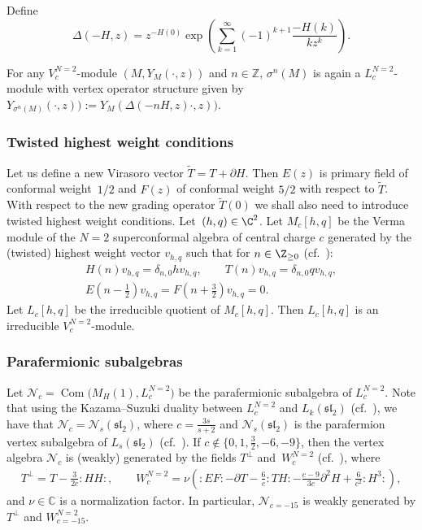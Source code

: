 Define
\[
 \Delta (-H,z) = z^{-H(0)}\exp \left ( \sum _{k=1} ^{\infty} (-1)^{k+1}\frac{-H(k) }{kz^k}\right ).
 \]

For any $V^{N=2}_{c}$-module $(M, Y_M(\cdot, z))$ and $n \in \mathbb{Z}$,
$\sigma^ n (M)$ is again a $L^{N=2}_{c}$-module with vertex operator structure given by
$ Y_{\sigma ^n (M) } ( \cdot , z)) := Y_{ M } (\Delta ( -n H, z) \cdot , z))$.

\subsubsection{Twisted highest weight conditions}
Let us define a new Virasoro vector $\widetilde T = T + \partial H$. Then $E(z)$ is primary field of conformal weight~$1/2$ and $F(z)$ of conformal weight $5/2$ with respect to $\widetilde T$.
 With respect to the new grading operator $\widetilde T(0)$ we shall also need to introduce twisted highest weight conditions.
 Let~${(h,q) \in {\C}^2}$. Let $M_c[h,q]$ be the Verma module of the $N=2$ superconformal algebra of central charge $c$ generated by the (twisted) highest weight vector $v_{h,q}$ such that for $n \in {\Z}_{\ge 0}$ (cf.\ \cite{FST}):
\begin{gather*}
 H(n) v_{h,q} =\delta_{n, 0} h v_{h,q}, \qquad T(n) v_{h,q} = \delta_{n,0} q v_{h,q}, \\ E\left(n-\frac{1}{2}\right) v_{h,q} = F\left(n+\frac{3}{2}\right) v_{h,q} =0.
 \end{gather*}
 Let $L_c[h,q]$ be the irreducible quotient of $M_c[h,q]$. Then $L_c[h,q]$ is an irreducible $V_c^{N=2}$-module.

\subsubsection{Parafermionic subalgebras}
\label{paraferm-1}
Let $ \mathcal N_c = \operatorname{Com} \bigl(M_H(1) , L^{N=2}_{c}\bigr) $ be the parafermionic subalgebra of $L^{N=2}_{c}$. Note that using the Kazama--Suzuki duality between $L^{N=2} _c$ and $L_k(\mathfrak{sl}_2)$ (cf.\ \cite{A-IMRN, FST}), we have that
$\mathcal N_c = \mathcal N_s (\mathfrak{sl}_2)$, where $c =\frac{3s}{s+2}$ and
$\mathcal N_s (\mathfrak{sl}_2)$ is the parafermion vertex subalgebra of $L_s(\mathfrak{sl}_2)$ (cf.\ \cite{DLY}). If $c \notin \{ 0, 1, \frac{3}{2}, -6, -9\}$, then the vertex algebra $ \mathcal N_c $ is (weakly) generated by the fields $ T^{\perp}$ and~$W^{N=2}_{c}$ (cf.\ \cite{BEHHH,DLY}), where
\begin{gather*}
	 T^{\perp} = T - \frac{3}{2c}{:}HH{:}, \qquad
	W^{N=2}_{c} = \nu \left({:} E F{:} - \partial T -\frac{6}{c}{:} T H{:} - \frac{c-9}{3c}\partial^2H + \frac{6}{c^2}{:}H^3{:} \right),
\end{gather*}
and $\nu \in \mathbb{C}$ is a normalization factor. In particular, $\mathcal N_{c=-15}$ is weakly generated by $T^{\perp}$ and $W^{N=2}_{c=-15}$.

